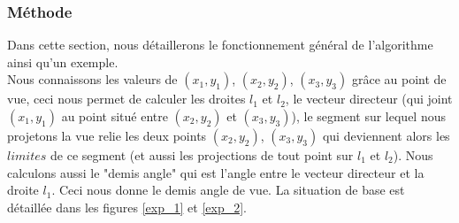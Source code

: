 \documentclass[11pt,a4paper]{article}
\theoremstyle{definition}
\theoremstyle{remark}
\begin{document}
\subsubsection{Méthode}
Dans cette section, nous détaillerons le fonctionnement général de l'algorithme ainsi qu'un exemple.\\

Nous connaissons les valeurs de $(x_1,y_1)$, $(x_2,y_2)$, $(x_3,y_3)$ grâce au point de vue, ceci nous permet de calculer les droites $l_1$ et $l_2$, le vecteur directeur (qui joint $(x_1,y_1)$ au point situé entre $(x_2,y_2)$ et $(x_3,y_3)$), le segment sur lequel nous projetons la vue relie les deux points $(x_2,y_2)$, $(x_3,y_3)$ qui deviennent alors les $limites$ de ce segment (et aussi les projections de tout point sur $l_1$ et $l_2$). Nous calculons aussi le "demis angle" qui est l'angle entre le vecteur directeur et la droite $l_1$. Ceci nous donne le demis angle de vue. La situation de base est détaillée dans les figures \ref{exp_1} et \ref{exp_2}.
\end{document}
